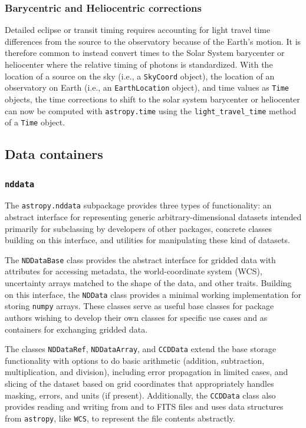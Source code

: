 \documentclass[modern]{aastex61}
\newcommand{\package}[1]{\texttt{#1}\xspace}
\newcommand{\astropypkg}{\package{astropy}}
\begin{document}
\subsubsection{Barycentric and Heliocentric corrections}
Detailed eclipse or transit
timing requires accounting for light travel time differences from the
source to the observatory because of the Earth's motion.
It is therefore common to instead convert times to the Solar System
barycenter or heliocenter where the relative timing of photons is
standardized.
With the location of a source on the sky (i.e., a \texttt{SkyCoord}
object), the location of an observatory on Earth (i.e., an
\texttt{EarthLocation} object), and time values as \texttt{Time}
objects, the time corrections to shift to the solar system barycenter or
heliocenter can now be computed with \package{astropy.time} using the
\texttt{light\_travel\_time} method of a \texttt{Time} object.

\subsection{Data containers}

\subsubsection{\package{nddata}}

The \package{astropy.nddata} subpackage provides three types of functionality: an
abstract interface for representing generic arbitrary-dimensional datasets
intended primarily for subclassing by developers of other packages, concrete
classes building on this interface, and utilities for manipulating these kind of
datasets.

The \texttt{NDDataBase} class provides the abstract interface for gridded data
with attributes for accessing metadata, the world-coordinate system (WCS),
uncertainty arrays matched to the shape of the data, and other traits.
Building on this interface, the \texttt{NDData} class provides a minimal
working implementation for storing \package{numpy} arrays. These classes serve
as useful base classes for package authors wishing to develop their own classes
for specific use cases and as containers for exchanging gridded data.

The classes \texttt{NDDataRef}, \texttt{NDDataArray}, and \texttt{CCDData}
extend the base storage functionality with options to do basic arithmetic
(addition, subtraction, multiplication, and division), including error
propagation in limited cases, and slicing of the dataset based on grid
coordinates that appropriately handles masking, errors, and units (if present).
Additionally, the \texttt{CCDData} class also provides reading and writing from
and to FITS files and uses data structures from \astropypkg, like \texttt{WCS},
to represent the file contents abstractly.
\end{document}
